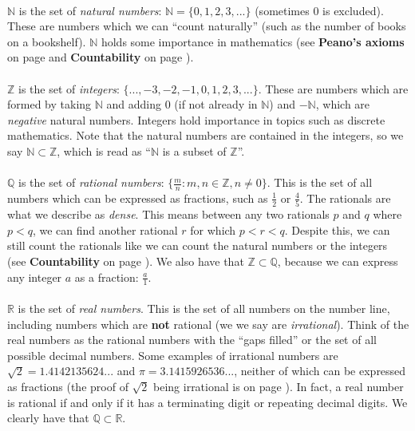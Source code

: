 \documentclass[12pt, a4paper, titlepage, twoside]{article}
\newcommand*{\N}{\mathbb{N}}
\newcommand*{\Z}{\mathbb{Z}}
\newcommand*{\Q}{\mathbb{Q}}
\newcommand*{\R}{\mathbb{R}}
\begin{document}
	\paragraph{}
	$\N$ is the set of \textit{natural numbers}: $\N = \{0,1,2,3,...\}$ (sometimes $0$ is excluded). These are numbers which we can 
	``count	naturally'' (such as the number of books on a bookshelf). $\N$ holds some importance in mathematics (see 
	\textbf{Peano's axioms} on page \pageref*{fr:peano} and \textbf{Countability} on page \pageref*{fr:countability}).
	
	\paragraph{}
	$\Z$ is the set of \textit{integers}: $\{..., -3, -2, -1, 0, 1, 2, 3, ...\}$. These are numbers which are formed by taking $\N$ and adding
	0 (if not already in $\N$) and $-\N$, which are \textit{negative} natural numbers. Integers hold importance in topics such as
	discrete mathematics. Note that the natural numbers are contained in the integers, so we say $\N \subset \Z$, which is read as
	``$\N$ is a subset of $\Z$''.
	
	\paragraph{}
	$\Q$ is the set of \textit{rational numbers}: $\{\frac{m}{n} : m,n \in \Z, n \neq 0\}$. This is the set of all numbers which can be
	expressed as fractions, such as $\frac{1}{2}$ or $\frac{4}{5}$. The rationals are what we describe as \textit{dense}. This means
	between any two rationals $p$ and $q$ where $p < q$, we can find another rational $r$ for which $p < r < q$. Despite this, we can
	still count the rationals like we can count the natural numbers or the integers (see \textbf{Countability} on page 
	\pageref*{fr:countability}). We also have that $\Z \subset \Q$, because we can express any integer $a$ as a fraction: $\frac{a}{1}$.
	
	\paragraph{}
	$\R$ is the set of \textit{real numbers}. This is the set of all numbers on the number line, including numbers which are \textbf{not}
	rational (we we say are \textit{irrational}). Think of the real numbers as the rational numbers with the ``gaps filled'' or the set of
	all possible decimal numbers. Some examples of irrational numbers are $\sqrt{2} = 1.4142135624...$ and $\pi = 3.1415926536...$, 
	neither of which can be expressed as fractions (the proof of $\sqrt{2}$ being irrational is on page \pageref*{pf:root2}). In fact, a real
	number is rational if and only if it has a terminating digit or repeating decimal digits. We clearly have that $\Q \subset \R$.
	
\end{document}
